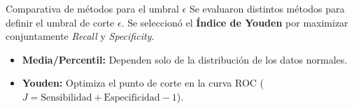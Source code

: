 \documentclass{beamer}
\begin{document}
\begin{frame}{Comparativa de métodos para el umbral $\epsilon$}
	\justifying
	\small
	Se evaluaron distintos métodos para definir el umbral de corte $\epsilon$. Se seleccionó el \textbf{Índice de Youden} por maximizar conjuntamente \emph{Recall} y \emph{Specificity}.
	
	\vspace{0.3cm}
	
	\centering
	
	\vspace{0.3cm}
	\begin{block}{}
		\footnotesize
		\begin{itemize}
			\item \textbf{Media/Percentil:} Dependen solo de la distribución de los datos normales.
			\item \textbf{Youden:} Optimiza el punto de corte en la curva ROC ($J = \text{Sensibilidad} + \text{Especificidad} - 1$).
		\end{itemize}
	\end{block}
\end{frame}
\end{document}
